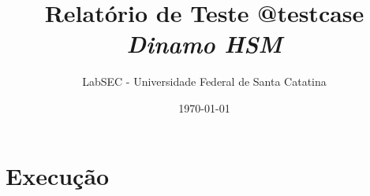 \documentclass[a4paper]{report}
\title{Relatório de Teste @testcase \\ \emph{Dinamo HSM} }
\author{LabSEC - Universidade Federal de Santa Catatina}
\date{\today}
\begin{document}
\maketitle

\section{Execução}
\begin{alltt}
	\small
	
\end{alltt}
\end{document}
